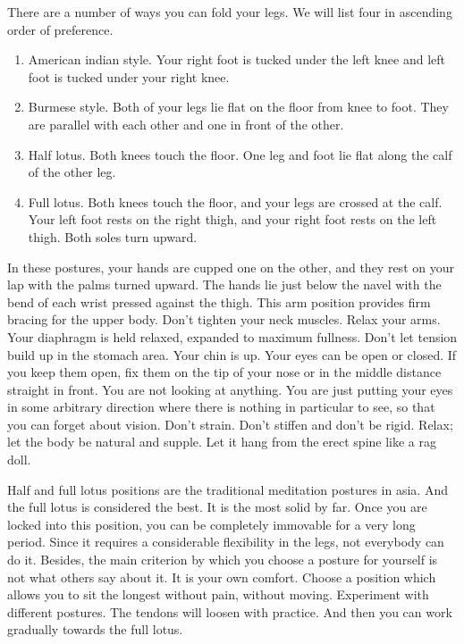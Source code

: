 There are a number of ways you can fold your legs. We will list four in
ascending order of preference.
\begin{enumerate}
\item American indian style. Your right foot is tucked under the left knee and left foot is tucked under your right knee.

\item Burmese style. Both of your legs lie flat on the floor from knee to foot.
They are parallel with each other and one in front of the other.

\item Half lotus. Both knees touch the floor. One leg and foot lie flat along the
calf of the other leg.

\item Full lotus. Both knees touch the floor, and your legs are crossed at the calf. Your left foot rests on the right thigh, and
your right foot rests on the left thigh. Both soles turn upward.
\end{enumerate}

In these postures, your hands are cupped one on the other, and they rest on your
lap with the palms turned upward. The hands lie just below the navel with the
bend of each wrist pressed against the thigh. This arm position provides firm
bracing for the upper body. Don't tighten your neck muscles. Relax your arms.
Your diaphragm is held relaxed, expanded to maximum fullness. Don't let tension
build up in the stomach area. Your chin is up. Your eyes can be open or closed.
If you keep them open, fix them on the tip of your nose or in the middle
distance straight in front. You are not looking at anything. You are just
putting your eyes in some arbitrary direction where there is nothing in
particular to see, so that you can forget about vision. Don't strain. Don't
stiffen and don't be rigid. Relax; let the body be natural and supple. Let it
hang from the erect spine like a rag doll.

Half and full lotus positions are the traditional meditation postures in asia.
And the full lotus is considered the best. It is the most solid by far. Once you
are locked into this position, you can be completely immovable for a very long
period. Since it requires a considerable flexibility in the legs, not everybody
can do it. Besides, the main criterion by which you choose a posture for
yourself is not what others say about it. It is your own comfort. Choose a
position which allows you to sit the longest without pain, without moving.
Experiment with different postures. The tendons will loosen with practice. And
then you can work gradually towards the full lotus.

